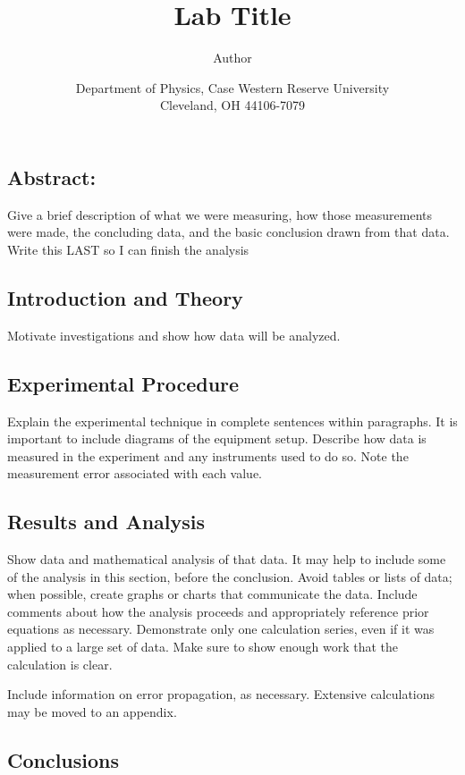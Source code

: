 \documentclass[letterpaper, 12pt]{article}
\title{Lab Title}
\author{Author}
\date{Department of Physics, Case Western Reserve University \\ Cleveland, OH 44106-7079}
\begin{document}
\maketitle

	\subsection*{Abstract:}
	
		Give a brief description of what we were measuring, how those measurements were made, the concluding data, and the basic conclusion drawn from that data. Write this LAST so I can finish the analysis
	
	\subsection*{Introduction and Theory}
	
		Motivate investigations and show how data will be analyzed.
	
	\subsection*{Experimental Procedure}
	
		Explain the experimental technique in complete sentences within paragraphs. It is important to include diagrams of the equipment setup. Describe how data is measured in the experiment and any instruments used to do so. Note the measurement error associated with each value.
	
	\subsection*{Results and Analysis}
	
		Show data and mathematical analysis of that data. It may help to include some of the analysis in this section, before the conclusion. Avoid tables or lists of data; when possible, create graphs or charts that communicate the data. Include comments about how the analysis proceeds and appropriately reference prior equations as necessary. Demonstrate only one calculation series, even if it was applied to a large set of data. Make sure to show enough work that the calculation is clear. 
		
		Include information on error propagation, as necessary. Extensive calculations may be moved to an appendix. 
	
	\subsection*{Conclusions}
	
\end{document}
